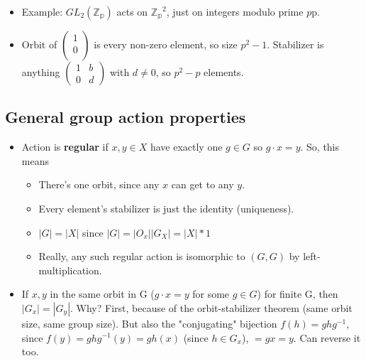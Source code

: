 \documentclass[11pt, oneside]{article}   	%
\begin{document}
\begin{itemize}
\item Example: $GL_2(\mathbb{\mathbb{Z}_p})$ acts on $\mathbb{\mathbb{Z}_p}^2$, just on integers modulo prime $p$p.
\item Orbit of $\begin{pmatrix} 1 \\ 0 \\ \end{pmatrix} $ is every non-zero element, so size $p^2-1$.  Stabilizer is anything $\begin{pmatrix} 1 & b \\ 0 & d \end{pmatrix}$ with $d \neq 0$, so $p^2 - p$ elements.
\end{itemize}


\subsection{General group action properties}
\begin{itemize}
\item Action is \textbf{regular} if $x, y \in X$ have exactly one  $g \in G$ so $g \cdot x = y$.  So, this means
  \begin{itemize}
  \item There's one orbit, since any $x$ can get to any $y$.
  \item Every element's stabilizer is just the identity (uniqueness).
  \item $|G| = |X|$ since $|G| = |O_x| |G_X| = |X| * 1$
  \item Really, any such regular action is isomorphic to $(G , G)$ by left-multiplication.
  \end{itemize}
\item If $x, y$ in the same orbit in G ($g \cdot x = y$ for some $g \in G$) for finite G, then $|G_x| = |G_y|$. Why?  First, because of the orbit-stabilizer theorem (same orbit size, same group size).  But also the "conjugating" bijection $f(h) = ghg^{-1}$, since $f(y) = ghg^{-1}(y) = gh(x)$ (since $h \in G_x$), $ = gx = y$.  Can reverse it too.
\end{itemize}
\end{document}
